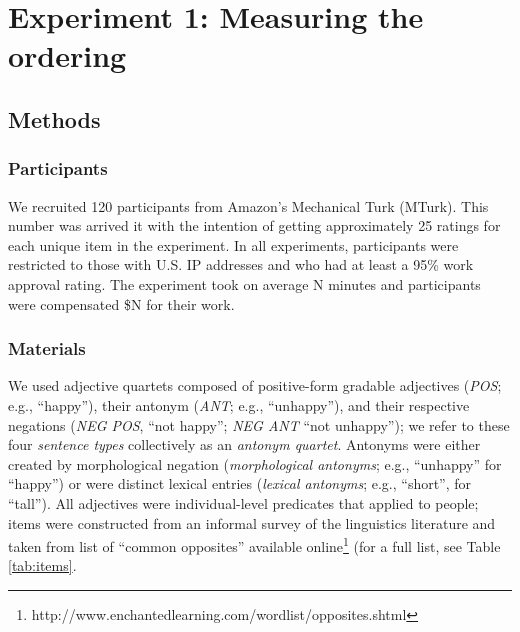 \documentclass[10pt,letterpaper]{article}
\newcommand{\tableref}[1]{Table \ref{#1}}
\begin{document}
\section{Experiment 1: Measuring the ordering}
\subsection{Methods}
\subsubsection{Participants}

We recruited 120 participants from Amazon's Mechanical Turk (MTurk). 
This number was arrived it with the intention of getting approximately 25 ratings for each unique item in the experiment.
In all experiments, participants were restricted to those with U.S. IP addresses and who had at least a 95\% work approval rating. 
The experiment took on average N minutes and participants were compensated \$N for their work.

\subsubsection{Materials}

We used adjective quartets composed of positive-form gradable adjectives (\emph{POS}; e.g., ``happy''), their antonym (\emph{ANT}; e.g., ``unhappy''), and their respective negations (\emph{NEG POS}, ``not happy''; \emph{NEG ANT} ``not unhappy''); we refer to these four \emph{sentence types} collectively as an \emph{antonym quartet}.
Antonyms were either created by morphological negation (\emph{morphological antonyms}; e.g., ``unhappy'' for ``happy'') or were distinct lexical entries (\emph{lexical antonyms}; e.g., ``short'', for ``tall'').
All adjectives were individual-level predicates that applied to people; items were constructed from an informal survey of the linguistics literature and taken from list of ``common opposites'' available online\footnote{http://www.enchantedlearning.com/wordlist/opposites.shtml} (for a full list, see \tableref{tab:items}.
\end{document}
